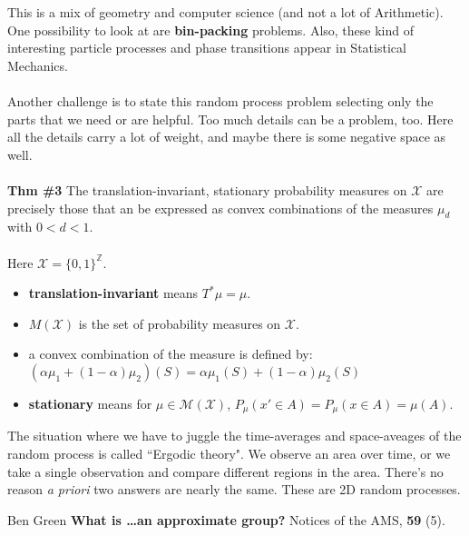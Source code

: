 \documentclass[12pt]{article}
\begin{document}
This is a mix of geometry and computer science (and not a lot of Arithmetic).  One possibility to look at are \textbf{bin-packing} problems.  Also, these kind of interesting particle processes and phase transitions appear in Statistical Mechanics.  \\ \\
Another challenge is to state this random process problem selecting only the parts that we need or are helpful.  Too much details can be a problem, too.  Here all the details carry a lot of weight, and maybe there is some negative space as well. \\ \\
\textbf{Thm \#3} The translation-invariant, stationary probability measures on $\mathcal{X}$ are precisely those that an be expressed as convex combinations of the measures $\mu_d$ with $0 < d < 1$. \\ \\
Here $\mathcal{X} = \{ 0, 1\}^{\mathbb{Z}}$.
\begin{itemize}
\item \textbf{translation-invariant} means $T^* \mu = \mu$.
\item $M(\mathcal{X})$ is the set of probability measures on $\mathcal{X}$.
\item a convex combination of the measure is defined by: $(\alpha \mu_1 + (1- \alpha)\mu_2 )(S) = \alpha \mu_1(S) + (1- \alpha)\mu_2(S)$
\item \textbf{stationary} means for $\mu \in \mathcal{M}(\mathcal{X})$,  $P_\mu(x' \in A) = P_\mu(x \in A)= \mu(A)$.
\end{itemize}
The situation where we have to juggle the time-averages and space-aveages of the random process is called ``Ergodic theory".  We observe an area over time, or we take a single observation and compare different regions in the area.  There's no reason \textit{ a priori } two answers are nearly the same.  These are 2D random processes.

\vfill

\begin{thebibliography}{}

\item Ben Green \textbf{What is \dots an approximate group?} Notices of the AMS, \textbf{59} (5).

\end{thebibliography} 
\end{document}
